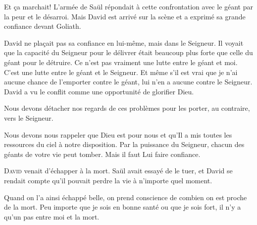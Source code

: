Et \c{c}a marchait! L'armée de Saül répondait à cette confrontation
 avec le géant par la peur et le désarroi.
 Mais David est arrivé sur la scène et a exprimé
 sa grande confiance devant Goliath.

David ne pla\c{c}ait pas sa confiance en lui-même, mais dans le Seigneur.
 Il voyait que la capacité du Seigneur pour le délivrer était
 beaucoup plus forte que celle du géant pour le détruire.
 \Og Ce n'est pas vraiment une lutte entre le géant et moi.
 C'est une lutte entre le géant et le Seigneur.
 Et même s'il est vrai que je n'ai aucune chance de l'emporter contre le géant,
 lui n'en a aucune contre le Seigneur. \Fg{}
 David a vu le conflit comme une opportunité de glorifier Dieu.


Nous devons détacher nos regards de ces problèmes pour les porter,
 au contraire, vers le Seigneur.

Nous devons nous rappeler que Dieu est pour nous et qu'Il a mis
 toutes les ressources du ciel à notre disposition.
 Par la puissance du Seigneur, chacun des géants de votre vie peut tomber.
 Mais il faut Lui faire confiance. 

\dvrule







\lettrine{D}{avid} venait d'échapper à la mort.
 Saül avait essayé de le tuer, et David se rendait compte
 qu'il pouvait perdre la vie à n'importe quel moment.

Quand on l'a ainsi échappé belle, on prend conscience de combien
 on est proche de la mort.
 Peu importe que je sois en bonne santé ou que je sois fort,
 il n'y a qu'un pas entre moi et la mort.


